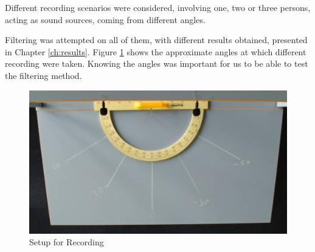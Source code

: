 Different recording scenarios were considered, involving one, two or three persons, acting as sound sources,
coming from different angles.

Filtering was attempted on all of them, with different results obtained, presented in Chapter \ref{ch:results}.
\newpage
Figure \ref{fig:recSetup} shows the approximate angles at which different recording were taken. Knowing the 
angles was important for us to be able to test the filtering method.

\begin{figure}[htp]
	\centering
	\includegraphics[width=1\textwidth]{Illustrations/JustSetup.jpg}
	\caption{Setup for Recording}
	\label{fig:recSetup}
\end{figure}



 

